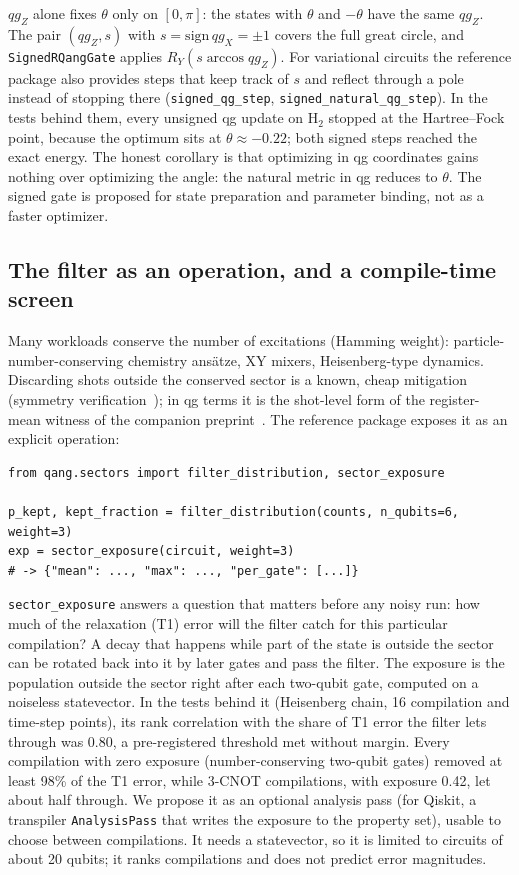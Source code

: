 \documentclass[11pt]{article}
\newcommand{\qgZ}{qg_Z}
\newcommand{\qgX}{qg_X}
\begin{document}
$\qgZ$ alone fixes $\theta$ only on $[0,\pi]$: the states with $\theta$ and $-\theta$ have the same $\qgZ$. The
pair $(\qgZ,s)$ with $s=\mathrm{sign}\,\qgX=\pm1$ covers the full great circle, and
\texttt{SignedRQangGate} applies $R_Y(s\arccos\qgZ)$. For variational circuits the reference package also
provides steps that keep track of $s$ and reflect through a pole instead of stopping there
(\texttt{signed\_qg\_step}, \texttt{signed\_natural\_qg\_step}). In the tests behind them, every
unsigned qg update on H$_2$ stopped at the Hartree--Fock point, because the optimum sits at
$\theta\approx-0.22$; both signed steps reached the exact energy. The honest corollary is that
optimizing in qg coordinates gains nothing over optimizing the angle: the natural metric in qg reduces to
$\theta$. The signed gate is proposed for state preparation and parameter binding, not as a faster
optimizer.

\subsection{The filter as an operation, and a compile-time screen}\label{sec:sectors}

Many workloads conserve the number of excitations (Hamming weight): particle-number-conserving chemistry
ansätze, XY mixers, Heisenberg-type dynamics. Discarding shots outside the conserved sector is a known,
cheap mitigation (symmetry verification~\cite{bonetmonroig2018,mcardle2019}); in qg terms it is the
shot-level form of the register-mean witness of the companion preprint~\cite{monteverde2026witness}. The
reference package exposes it as an explicit operation:

\begin{lstlisting}
from qang.sectors import filter_distribution, sector_exposure

p_kept, kept_fraction = filter_distribution(counts, n_qubits=6, weight=3)
exp = sector_exposure(circuit, weight=3)
# -> {"mean": ..., "max": ..., "per_gate": [...]}
\end{lstlisting}

\texttt{sector\_exposure} answers a question that matters before any noisy run: how much of the
relaxation (T1) error will the filter catch for this particular compilation? A decay that happens while
part of the state is outside the sector can be rotated back into it by later gates and pass the filter.
The exposure is the population outside the sector right after each two-qubit gate, computed on a
noiseless statevector. In the tests behind it (Heisenberg chain, 16 compilation and time-step points),
its rank correlation with the share of T1 error the filter lets through was 0.80, a pre-registered
threshold met without margin. Every compilation with zero exposure (number-conserving two-qubit gates)
removed at least 98\% of the T1 error, while 3-CNOT compilations, with exposure 0.42, let about half
through. We propose it as an optional analysis pass (for Qiskit, a transpiler \texttt{AnalysisPass}
that writes the exposure to the property set), usable to choose between compilations. It needs a
statevector, so it is limited to circuits of about 20 qubits; it ranks compilations and does not
predict error magnitudes.
\end{document}
